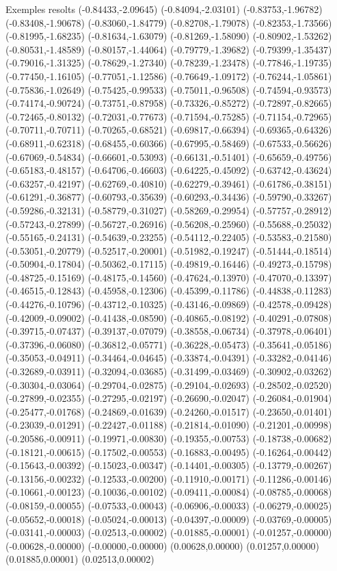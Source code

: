\documentclass[11pt,a4paper]{article}
\begin{document}
\begin{fmex}{Exemples resolts}
(-0.84433,-2.09645) (-0.84094,-2.03101) (-0.83753,-1.96782) (-0.83408,-1.90678) (-0.83060,-1.84779) (-0.82708,-1.79078) (-0.82353,-1.73566) (-0.81995,-1.68235) (-0.81634,-1.63079) (-0.81269,-1.58090) (-0.80902,-1.53262) (-0.80531,-1.48589) (-0.80157,-1.44064) (-0.79779,-1.39682) (-0.79399,-1.35437) (-0.79016,-1.31325) (-0.78629,-1.27340) (-0.78239,-1.23478) (-0.77846,-1.19735) (-0.77450,-1.16105) (-0.77051,-1.12586) (-0.76649,-1.09172) (-0.76244,-1.05861) (-0.75836,-1.02649) (-0.75425,-0.99533) (-0.75011,-0.96508) (-0.74594,-0.93573) (-0.74174,-0.90724) (-0.73751,-0.87958) (-0.73326,-0.85272) (-0.72897,-0.82665) (-0.72465,-0.80132) (-0.72031,-0.77673) (-0.71594,-0.75285) (-0.71154,-0.72965) (-0.70711,-0.70711) (-0.70265,-0.68521) (-0.69817,-0.66394) (-0.69365,-0.64326) (-0.68911,-0.62318) (-0.68455,-0.60366) (-0.67995,-0.58469) (-0.67533,-0.56626) (-0.67069,-0.54834) (-0.66601,-0.53093) (-0.66131,-0.51401) (-0.65659,-0.49756) (-0.65183,-0.48157) (-0.64706,-0.46603) (-0.64225,-0.45092) (-0.63742,-0.43624) (-0.63257,-0.42197) (-0.62769,-0.40810) (-0.62279,-0.39461) (-0.61786,-0.38151) (-0.61291,-0.36877) (-0.60793,-0.35639) (-0.60293,-0.34436) (-0.59790,-0.33267) (-0.59286,-0.32131) (-0.58779,-0.31027) (-0.58269,-0.29954) (-0.57757,-0.28912) (-0.57243,-0.27899) (-0.56727,-0.26916) (-0.56208,-0.25960) (-0.55688,-0.25032) (-0.55165,-0.24131) (-0.54639,-0.23255) (-0.54112,-0.22405) (-0.53583,-0.21580) (-0.53051,-0.20779) (-0.52517,-0.20001) (-0.51982,-0.19247) (-0.51444,-0.18514) (-0.50904,-0.17804) (-0.50362,-0.17115) (-0.49819,-0.16446) (-0.49273,-0.15798) (-0.48725,-0.15169) (-0.48175,-0.14560) (-0.47624,-0.13970) (-0.47070,-0.13397) (-0.46515,-0.12843) (-0.45958,-0.12306) (-0.45399,-0.11786) (-0.44838,-0.11283) (-0.44276,-0.10796) (-0.43712,-0.10325) (-0.43146,-0.09869) (-0.42578,-0.09428) (-0.42009,-0.09002) (-0.41438,-0.08590) (-0.40865,-0.08192) (-0.40291,-0.07808) (-0.39715,-0.07437) (-0.39137,-0.07079) (-0.38558,-0.06734) (-0.37978,-0.06401) (-0.37396,-0.06080) (-0.36812,-0.05771) (-0.36228,-0.05473) (-0.35641,-0.05186) (-0.35053,-0.04911) (-0.34464,-0.04645) (-0.33874,-0.04391) (-0.33282,-0.04146) (-0.32689,-0.03911) (-0.32094,-0.03685) (-0.31499,-0.03469) (-0.30902,-0.03262) (-0.30304,-0.03064) (-0.29704,-0.02875) (-0.29104,-0.02693) (-0.28502,-0.02520) (-0.27899,-0.02355) (-0.27295,-0.02197) (-0.26690,-0.02047) (-0.26084,-0.01904) (-0.25477,-0.01768) (-0.24869,-0.01639) (-0.24260,-0.01517) (-0.23650,-0.01401) (-0.23039,-0.01291) (-0.22427,-0.01188) (-0.21814,-0.01090) (-0.21201,-0.00998) (-0.20586,-0.00911) (-0.19971,-0.00830) (-0.19355,-0.00753) (-0.18738,-0.00682) (-0.18121,-0.00615) (-0.17502,-0.00553) (-0.16883,-0.00495) (-0.16264,-0.00442) (-0.15643,-0.00392) (-0.15023,-0.00347) (-0.14401,-0.00305) (-0.13779,-0.00267) (-0.13156,-0.00232) (-0.12533,-0.00200) (-0.11910,-0.00171) (-0.11286,-0.00146) (-0.10661,-0.00123) (-0.10036,-0.00102) (-0.09411,-0.00084) (-0.08785,-0.00068) (-0.08159,-0.00055) (-0.07533,-0.00043) (-0.06906,-0.00033) (-0.06279,-0.00025) (-0.05652,-0.00018) (-0.05024,-0.00013) (-0.04397,-0.00009) (-0.03769,-0.00005) (-0.03141,-0.00003) (-0.02513,-0.00002) (-0.01885,-0.00001) (-0.01257,-0.00000) (-0.00628,-0.00000) (-0.00000,-0.00000) (0.00628,0.00000) (0.01257,0.00000) (0.01885,0.00001) (0.02513,0.00002) 
\end{fmex}
\end{document}
